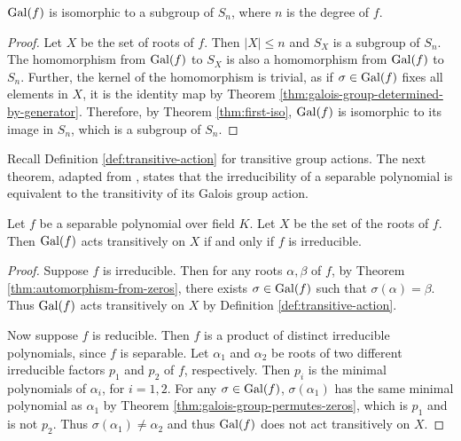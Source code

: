 \begin{corollary} \label{thm:galois-group-isomorphic-symmetric-subgroup}
	$\operatorname{Gal}(f)$ is isomorphic to a subgroup of $S_n$, where $n$ is the degree of $f$. 
\end{corollary}

\begin{proof}
	Let $X$ be the set of roots of $f$. Then $|X| \le n$ and $S_X$ is a subgroup of $S_n$. The homomorphism from $\operatorname{Gal}(f)$ to $S_X$ is also a homomorphism from $\operatorname{Gal}(f)$ to $S_n$. Further, the kernel of the homomorphism is trivial, as if $\sigma \in \operatorname{Gal}(f)$ fixes all elements in $X$, it is the identity map by Theorem \ref{thm:galois-group-determined-by-generator}. Therefore, by Theorem \ref{thm:first-iso}, $\operatorname{Gal}(f)$ is isomorphic to its image in $S_n$, which is a subgroup of $S_n$. 
\end{proof}

Recall Definition \ref{def:transitive-action} for transitive group actions. The next theorem, adapted from \cite{galois-permutation}, states that the irreducibility of a separable polynomial is equivalent to the transitivity of its Galois group action.

\begin{theorem} \label{thm:galois-action-transitive-irreducible}
	Let $f$ be a separable polynomial over field $K$. Let $X$ be the set of the roots of $f$. Then $\operatorname{Gal}(f)$ acts transitively on $X$ if and only if $f$ is irreducible. 
\end{theorem}

\begin{proof}
	Suppose $f$ is irreducible. Then for any roots $\alpha, \beta$ of $f$, by Theorem \ref{thm:automorphism-from-zeros}, there exists $\sigma \in \operatorname{Gal}(f)$ such that $\sigma(\alpha) = \beta$. Thus $\operatorname{Gal}(f)$ acts transitively on $X$ by Definition \ref{def:transitive-action}. 
	
	Now suppose $f$ is reducible. Then $f$ is a product of distinct irreducible polynomials, since $f$ is separable. Let $\alpha_1$ and $\alpha_2$ be roots of two different irreducible factors $p_1$ and $p_2$ of $f$, respectively. Then $p_i$ is the minimal polynomials of $\alpha_i$, for $i = 1, 2$. For any $\sigma \in \operatorname{Gal}(f)$, $\sigma(\alpha_1)$ has the same minimal polynomial as $\alpha_1$ by Theorem \ref{thm:galois-group-permutes-zeros}, which is $p_1$ and is not $p_2$. Thus $\sigma(\alpha_1) \neq \alpha_2$ and thus $\operatorname{Gal}(f)$ does not act transitively on $X$. 
\end{proof}

